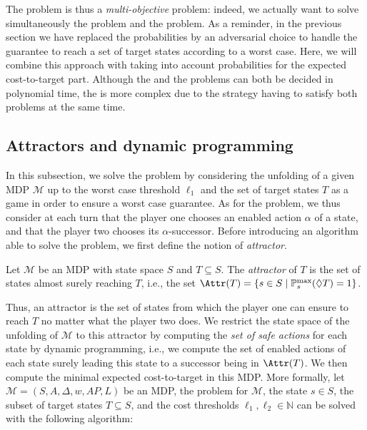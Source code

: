 The \SSPWE{} problem is thus a \textit{multi-objective} problem: indeed, we actually want to solve simultaneously the \SPG{} problem and the \SSPE{} problem.
As a reminder, in the previous section we have replaced the probabilities by an adversarial choice to handle the guarantee to reach a set of target states according to a worst case.
Here, we will combine this approach with taking into account probabilities for the expected cost-to-target part.
Although the \SSPE{} and the \SPG{} problems can both be decided in polynomial time, the \SSPWE{} is more complex due to the strategy having to satisfy both problems at the same time.

\subsection{Attractors and dynamic programming}

In this subsection, we solve the problem by considering the unfolding of a given MDP $\mathcal{M}$ up to the worst case threshold $\ell_1$ and the set of target states $T$ as a game in order to ensure a worst case guarantee.
As for the \SPG{} problem, we thus consider at each turn that the player one chooses an enabled action $\alpha$ of a state, and that the player two chooses its $\alpha$-successor.
Before introducing an algorithm able to solve the \SSPWE{} problem, we first define the notion of \textit{attractor}.
\begin{definition}
  Let $\mathcal{M}$ be an MDP with state space $S$ and $T \subseteq S$. The \textit{attractor} of $T$ is the set of states almost surely reaching $T$, i.e., the set $\Attr(T) = \{ s \in S \; | \; \mathbb{P}^{\max}_s (\Diamond T) = 1 \}$.
\end{definition}
Thus, an attractor is the set of states from which the player one can ensure to reach $T$ no matter what the player two does.
We restrict the state space of the unfolding of $\mathcal{M}$ to this attractor by computing the \textit{set of safe actions} for each state by dynamic programming, i.e., we compute the set of enabled actions of each state surely leading this state to a successor being in $\Attr(T)$.
We then compute the minimal expected cost-to-target in this MDP.
More formally, let $\mathcal{M}=(S, A, \Delta, w, AP, L)$ be an MDP, the \SSPWE{} problem for $\mathcal{M}$, the state $s \in S$, the subset of target states $T \subseteq S$, and the cost thresholds $\ell_1, \ell_2 \in \mathbb{N}$ can be solved with the following algorithm:

